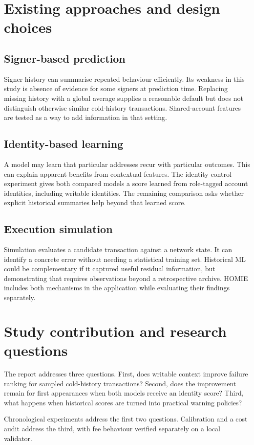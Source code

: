 \documentclass[12pt,a4paper,oneside]{report}
\begin{document}
\section{Existing approaches and design choices}
\subsection{Signer-based prediction}
Signer history can summarise repeated behaviour efficiently. Its weakness in this study is absence of evidence for some signers at prediction time. Replacing missing history with a global average supplies a reasonable default but does not distinguish otherwise similar cold-history transactions. Shared-account features are tested as a way to add information in that setting.
\subsection{Identity-based learning}
A model may learn that particular addresses recur with particular outcomes. This can explain apparent benefits from contextual features. The identity-control experiment gives both compared models a score learned from role-tagged account identities, including writable identities. The remaining comparison asks whether explicit historical summaries help beyond that learned score.
\subsection{Execution simulation}
Simulation evaluates a candidate transaction against a network state. It can identify a concrete error without needing a statistical training set. Historical ML could be complementary if it captured useful residual information, but demonstrating that requires observations beyond a retrospective archive. HOMIE includes both mechanisms in the application while evaluating their findings separately.
\section{Study contribution and research questions}
The report addresses three questions. First, does writable context improve failure ranking for sampled cold-history transactions? Second, does the improvement remain for first appearances when both models receive an identity score? Third, what happens when historical scores are turned into practical warning policies?

Chronological experiments address the first two questions. Calibration and a cost audit address the third, with fee behaviour verified separately on a local validator.
\end{document}
